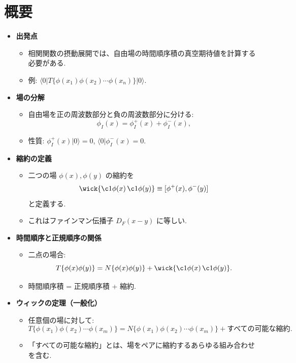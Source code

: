 \documentclass[a4paper,12pt]{article}
\begin{document}
\section*{概要}
\begin{itemize}
  \item \textbf{出発点}
  \begin{itemize}
    \item 相関関数の摂動展開では、自由場の時間順序積の真空期待値を計算する必要がある.
    \item 例: $\langle 0| T\{\phi(x_1)\phi(x_2)\cdots \phi(x_n)\}|0\rangle$.
  \end{itemize}

  \item \textbf{場の分解}
  \begin{itemize}
    \item 自由場を正の周波数部分と負の周波数部分に分ける:
    \[
      \phi_I(x) = \phi_I^+(x) + \phi_I^-(x),
    \]
    \item 性質: $\phi_I^+(x)|0\rangle=0$, $\langle 0|\phi_I^-(x)=0$.
  \end{itemize}

  \item \textbf{縮約の定義}
  \begin{itemize}
    \item 二つの場 $\phi(x), \phi(y)$ の縮約を
    \[
      \wick{\c1 \phi(x)\, \c1 \phi(y)}
      \equiv [\phi^+(x), \phi^-(y)]
    \]
    と定義する.
    \item これはファインマン伝播子 $D_F(x-y)$ に等しい.
  \end{itemize}

  \item \textbf{時間順序と正規順序の関係}
  \begin{itemize}
    \item 二点の場合:
    \[
      T\{\phi(x)\phi(y)\} = N\{\phi(x)\phi(y)\} 
      + \wick{\c1 \phi(x)\, \c1 \phi(y)}.
    \]
    \item 時間順序積 = 正規順序積 + 縮約.
  \end{itemize}

  \item \textbf{ウィックの定理（一般化）}
  \begin{itemize}
    \item 任意個の場に対して:
    \[
      T\{\phi(x_1)\phi(x_2)\cdots\phi(x_m)\}
      = N\{\phi(x_1)\phi(x_2)\cdots\phi(x_m)\} 
      + \text{すべての可能な縮約}.
    \]
    \item 「すべての可能な縮約」とは、場をペアに縮約するあらゆる組み合わせを含む.
  \end{itemize}


\end{itemize}
\end{document}
